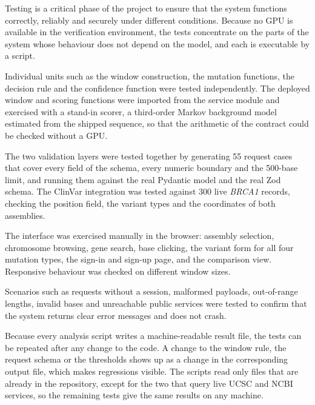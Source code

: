 Testing is a critical phase of the project to ensure that the system functions correctly, reliably and securely under different conditions. Because no GPU is available in the verification environment, the tests concentrate on the parts of the system whose behaviour does not depend on the model, and each is executable by a script.

Individual units such as the window construction, the mutation functions, the decision rule and the confidence function were tested independently. The deployed window and scoring functions were imported from the service module and exercised with a stand-in scorer, a third-order Markov background model estimated from the shipped sequence, so that the arithmetic of the contract could be checked without a GPU.

The two validation layers were tested together by generating 55 request cases that cover every field of the schema, every numeric boundary and the 500-base limit, and running them against the real Pydantic model and the real Zod schema. The ClinVar integration was tested against 300 live \textit{BRCA1} records, checking the position field, the variant types and the coordinates of both assemblies.

The interface was exercised manually in the browser: assembly selection, chromosome browsing, gene search, base clicking, the variant form for all four mutation types, the sign-in and sign-up page, and the comparison view. Responsive behaviour was checked on different window sizes.

Scenarios such as requests without a session, malformed payloads, out-of-range lengths, invalid bases and unreachable public services were tested to confirm that the system returns clear error messages and does not crash.


Because every analysis script writes a machine-readable result file, the tests can be repeated after any change to the code. A change to the window rule, the request schema or the thresholds shows up as a change in the corresponding output file, which makes regressions visible. The scripts read only files that are already in the repository, except for the two that query live UCSC and NCBI services, so the remaining tests give the same results on any machine.

